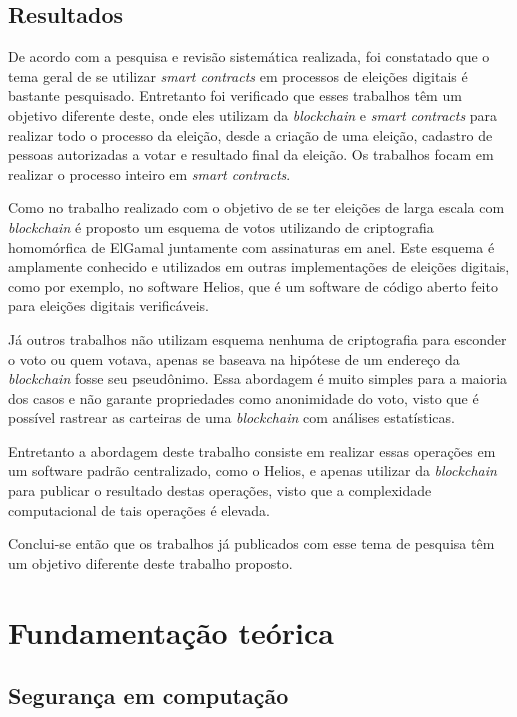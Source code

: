 \documentclass{ufsctex/ufsctex}
\begin{document}
\section{Resultados}

De acordo com a pesquisa e revisão sistemática realizada, foi constatado que o
tema geral de se utilizar \textit{smart contracts} em processos de eleições
digitais é bastante pesquisado. Entretanto foi verificado que esses trabalhos
têm um objetivo diferente deste, onde eles utilizam da \textit{blockchain} e
\textit{smart contracts} para realizar todo o processo da eleição, desde a
criação de uma eleição, cadastro de pessoas autorizadas a votar e resultado
final da eleição. Os trabalhos focam em realizar o processo inteiro em
\textit{smart contracts}.

Como no trabalho realizado com o objetivo de se ter eleições de larga escala
com \textit{blockchain} é proposto um esquema de votos utilizando de
criptografia homomórfica de ElGamal juntamente com assinaturas em anel.
\cite{WANG2018234} Este esquema é amplamente conhecido e utilizados em outras
implementações de eleições digitais, como por exemplo, no software Helios, que
é um software de código aberto feito para eleições digitais verificáveis.

Já outros trabalhos não utilizam esquema nenhuma de criptografia para esconder
o voto ou quem votava, apenas se baseava na hipótese de um endereço da
\textit{blockchain} fosse seu pseudônimo. \cite{Yavuz2018} Essa abordagem é
muito simples para a maioria dos casos e não garante propriedades como
anonimidade do voto, visto que é possível rastrear as carteiras de uma
\textit{blockchain} com análises estatísticas. \cite{Kosy2014}

Entretanto a abordagem deste trabalho consiste em realizar essas operações em
um software padrão centralizado, como o Helios, e apenas utilizar da
\textit{blockchain} para publicar o resultado destas operações, visto que a
complexidade computacional de tais operações é elevada.

Conclui-se então que os trabalhos já publicados com esse tema de pesquisa têm
um objetivo diferente deste trabalho proposto.

\chapter{Fundamentação teórica}

\section{Segurança em computação}
\end{document}
